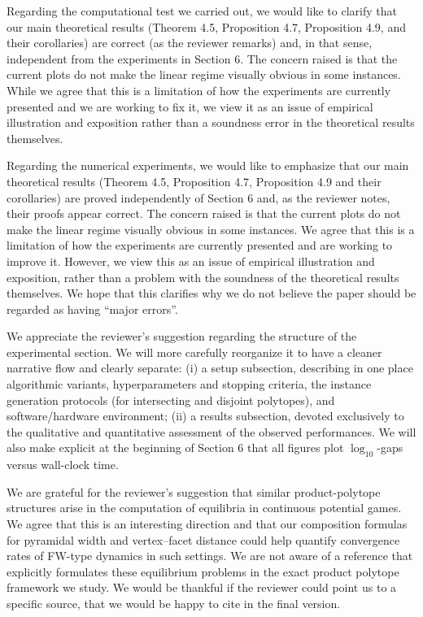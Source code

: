 \documentclass[a4wide]{article}
\begin{document}
Regarding the computational test we carried out, we would like to clarify that our main theoretical results (Theorem 4.5, Proposition 4.7, Proposition 4.9, and their corollaries) are correct (as the reviewer remarks) and, in that sense, independent from the experiments in Section 6. The concern raised is that the current plots do not make the linear regime visually obvious in some instances. While we agree that this is a limitation of how the experiments are currently presented and we are working to fix it, we view it as an issue of empirical illustration and exposition rather than a soundness error in the theoretical results themselves.

Regarding the numerical experiments, we would like to emphasize that our main theoretical results (Theorem 4.5, Proposition 4.7, Proposition 4.9 and their corollaries) are proved independently of Section 6 and, as the reviewer notes, their proofs appear correct. The concern raised is that the current plots do not make the linear regime visually obvious in some instances. We agree that
this is a limitation of how the experiments are currently presented and are working to improve it. However, we view this as an issue of empirical illustration and exposition, rather than a problem with the soundness of the theoretical results themselves. We hope that this clarifies why we do not believe the paper should be regarded as having ``major errors''.

We appreciate the reviewer's suggestion regarding the structure of the experimental section. We will more carefully reorganize it to have a cleaner narrative flow and clearly separate: (i) a setup subsection, describing in one place algorithmic variants, hyperparameters and stopping criteria, the instance generation protocols (for intersecting and disjoint polytopes), and software/hardware environment; (ii) a results subsection, devoted exclusively to the qualitative and quantitative assessment of the observed performances. We will also make explicit at the beginning of Section 6 that all figures plot $\log_{10}$-gaps versus wall-clock time.

We are grateful for the reviewer's suggestion that similar product-polytope structures arise in the computation of equilibria in continuous potential games. We agree that this is an interesting direction and that our composition formulas for pyramidal width and vertex–facet distance could help quantify convergence rates of FW-type dynamics in such settings. We are not aware of a reference that explicitly formulates these equilibrium problems in the exact product polytope framework we study. We would be thankful if the reviewer could point us to a specific source, that we would be happy to cite in the final version.




% 
% 

\clearpage
\appendix
\onecolumn
\end{document}
